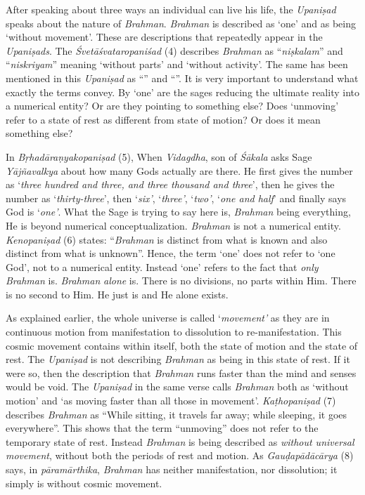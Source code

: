 After speaking about three ways an individual can live his life, the \emph{Upaniṣad} speaks about the nature of \emph{Brahman}. \emph{Brahman} is described as `one' and as being `without movement'. These are descriptions that repeatedly appear in the \emph{Upaniṣads}. The \emph{Śvetāśvataropaniśad} (4) describes \emph{Brahman} as ``\emph{niṣkalam}'' and ``\emph{niskriyam}'' meaning `without parts' and `without activity'. The same has been mentioned in this \emph{Upaniṣad} as ``'' and ``''. It is very important to understand what exactly the terms convey. By `one' are the sages reducing the ultimate reality into a numerical entity? Or are they pointing to something else? Does `unmoving' refer to a state of rest as different from state of motion? Or does it mean something else?

In \emph{Bṛhadāraṇyakopaniṣad} (5), When \emph{Vidagdha}, son of \emph{Śākala} asks Sage \emph{Yājñavalkya} about how many Gods actually are there. He first gives the number as `\emph{three hundred and three, and three thousand and three}', then he gives the number as `\emph{thirty-three}', then `\emph{six'}, `\emph{three'}, `\emph{two'}, `\emph{one and half}' and finally says God is `\emph{one'}. What the Sage is trying to say here is, \emph{Brahman} being everything, He is beyond numerical conceptualization. \emph{Brahman} is not a numerical entity. \emph{Kenopaniṣad} (6) states: ``\emph{Brahman} is distinct from what is known and also distinct from what is unknown''. Hence, the term `one' does not refer to `one God', not to a numerical entity. Instead `one' refers to the fact that \emph{only} \emph{Brahman} is. \emph{Brahman} \emph{alone} is. There is no divisions, no parts within Him. There is no second to Him. He just is and He alone exists.

As explained earlier, the whole universe is called `\emph{movement'} as they are in continuous motion from manifestation to dissolution to re-manifestation. This cosmic movement contains within itself, both the state of motion and the state of rest. The \emph{Upaniṣad} is not describing \emph{Brahman} as being in this state of rest. If it were so, then the description that \emph{Brahman} runs faster than the mind and senses would be void. The \emph{Upaniṣad} in the same verse calls \emph{Brahman} both as `without motion' and `as moving faster than all those in movement'. \emph{Kaṭhopaniṣad} (7) describes \emph{Brahman} as ``While sitting, it travels far away; while sleeping, it goes everywhere''. This shows that the term ``unmoving'' does not refer to the temporary state of rest. Instead \emph{Brahman} is being described as \emph{without universal movement}, without both the periods of rest and motion. As \emph{Gauḍapādācārya} (8) says, in \emph{pāramārthika}, \emph{Brahman} has neither manifestation, nor dissolution; it simply is without cosmic movement.

